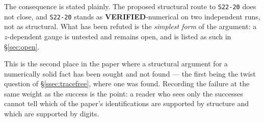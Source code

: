 The consequence is stated plainly. The proposed structural route to
\texttt{S22-20} does not close, and \texttt{S22-20} stands as
\textbf{VERIFIED}-numerical on two independent runs, not as structural. What
has been refuted is the \emph{simplest form} of the argument: a $z$-dependent
gauge is untested and remains open, and is listed as such in
\S\ref{sec:open}.

This is the second place in the paper where a structural argument for a
numerically solid fact has been sought and not found --- the first being the
twist question of \S\ref{ssec:tracefree}, where one was found. Recording the
failure at the same weight as the success is the point: a reader who sees only
the successes cannot tell which of the paper's identifications are supported by
structure and which are supported by digits.
